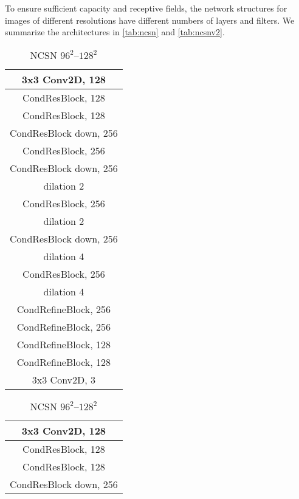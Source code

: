 \documentclass{article}
\begin{document}
To ensure sufficient capacity and receptive fields, the network structures for images of different resolutions have different numbers of layers and filters. We summarize the architectures in \cref{tab:ncsn} and \cref{tab:ncsnv2}.
\begin{table}[h]
    \centering
    \caption{The architectures of NCSN for images of various resolutions.}\label{tab:ncsn}
    \begin{subtable}[t]{0.3\linewidth}
    \centering
    \caption{NCSN $32^2$--$64^2$}\label{tab:ncsn_small_arch}
    \begin{tabular}{c}
    \toprule\toprule
    3x3 Conv2D, 128\\
    \midrule
    CondResBlock, 128\\
    \midrule
    CondResBlock, 128\\
    \midrule
    CondResBlock down, 256\\
    \midrule
    CondResBlock, 256\\
    \midrule
    CondResBlock down, 256\\ dilation 2\\
    \midrule
    CondResBlock, 256 \\ dilation 2\\
    \midrule
    CondResBlock down, 256\\ dilation 4\\
    \midrule
    CondResBlock, 256\\ dilation 4\\
    \midrule
    CondRefineBlock, 256\\
    \midrule
    CondRefineBlock, 256\\
    \midrule
    CondRefineBlock, 128\\
    \midrule
    CondRefineBlock, 128\\
    \midrule
    3x3 Conv2D, 3\\
    \bottomrule
    \end{tabular}
    \end{subtable}
    \hspace{3cm}
    \begin{subtable}[t]{0.3\linewidth}
    \centering
    \caption{NCSN $96^2$--$128^2$}
    \begin{tabular}{c}
    \toprule\toprule
    3x3 Conv2D, 128\\
    \midrule
    CondResBlock, 128\\
    \midrule
    CondResBlock, 128\\
    \midrule
    CondResBlock down, 256\\

\end{tabular}
\end{subtable}
\end{table}
\end{document}
